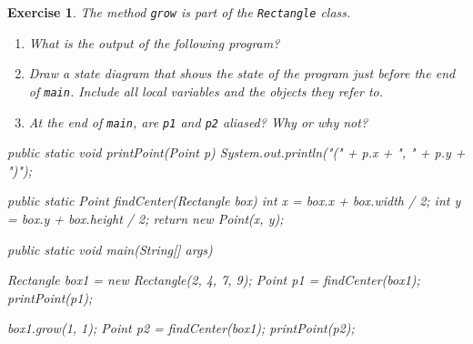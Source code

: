 \documentclass[12pt]{book}
\theoremstyle{exercise}
\newtheorem{exercise}{Exercise}[chapter]
\newcommand{\java}[1]{\lstinline{#1}} %
\begin{document}
\begin{exercise}
The method \java{grow} is part of the \java{Rectangle} class.

\begin{enumerate}

\item What is the output of the following program?

\item Draw a state diagram that shows the state of the program just before the end of \java{main}.
Include all local variables and the objects they refer to.

\item At the end of \java{main}, are \java{p1} and \java{p2} aliased?
Why or why not?

\end{enumerate}

\begin{code}
    public static void printPoint(Point p) {
        System.out.println("(" + p.x + ", " + p.y + ")");
    }

    public static Point findCenter(Rectangle box) {
        int x = box.x + box.width / 2;
        int y = box.y + box.height / 2;
        return new Point(x, y);
    }

    public static void main(String[] args) {
        Rectangle box1 = new Rectangle(2, 4, 7, 9);
        Point p1 = findCenter(box1);
        printPoint(p1);

        box1.grow(1, 1);
        Point p2 = findCenter(box1);
        printPoint(p2);
    }
\end{code}

\end{exercise}
\end{document}
